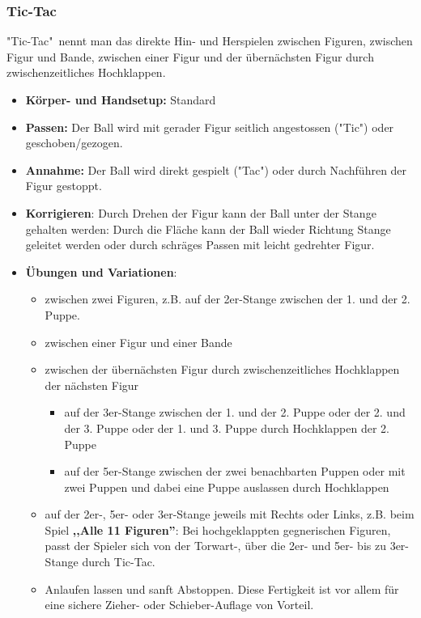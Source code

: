\subsubsection{Tic-Tac}
\label{technik:offensive:eine:tictac}
"Tic-Tac"\ nennt man das direkte Hin- und Herspielen zwischen Figuren, zwischen Figur und Bande, zwischen einer Figur und der übernächsten Figur durch zwischenzeitliches Hochklappen. 
\begin{itemize}
    \item \textbf{Körper- und Handsetup:} Standard 
    \item \textbf{Passen:} Der Ball wird mit gerader Figur seitlich angestossen ("Tic") oder geschoben/gezogen.
    \item \textbf{Annahme:} Der Ball wird direkt gespielt ("Tac") oder durch Nachführen der Figur gestoppt.
    \item \textbf{Korrigieren}: Durch Drehen der Figur kann der Ball unter der Stange gehalten werden: Durch die Fläche kann der Ball wieder Richtung Stange geleitet werden oder durch schräges Passen mit leicht gedrehter Figur.  
    \item \textbf{Übungen und Variationen}:
        \begin{itemize}
            \item zwischen zwei Figuren, z.B. auf der 2er-Stange zwischen der 1. und der 2. Puppe.
            \item zwischen einer Figur und einer Bande
            \item zwischen der übernächsten Figur durch zwischenzeitliches Hochklappen der nächsten Figur
                \begin{itemize}
                    \item auf der 3er-Stange zwischen der 1. und der 2. Puppe oder der 2. und der 3. Puppe oder der 1. und 3. Puppe durch Hochklappen der 2. Puppe
                    \item auf der 5er-Stange zwischen der zwei benachbarten Puppen oder mit zwei Puppen und dabei eine Puppe auslassen durch Hochklappen
                \end{itemize}
            \item auf der 2er-, 5er- oder 3er-Stange jeweils mit Rechts oder Links, z.B. beim Spiel \textbf{,,Alle 11 Figuren''}: Bei hochgeklappten gegnerischen Figuren, passt der Spieler sich von der Torwart-, über die 2er- und 5er- bis zu 3er-Stange durch Tic-Tac. 
            \item Anlaufen lassen und sanft Abstoppen. Diese Fertigkeit ist vor allem für eine sichere Zieher- oder Schieber-Auflage von Vorteil.
        \end{itemize}
\end{itemize}


